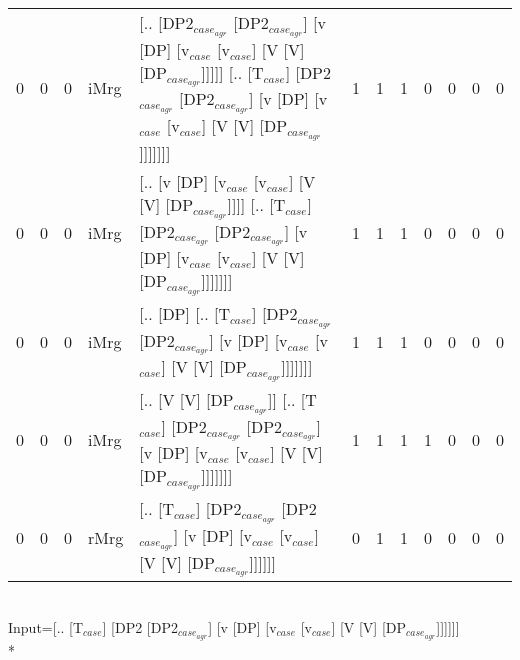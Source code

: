 \begin{tabularx}{\linewidth}{rrrlXrrrrrrr}
   0 &       0 &   0 & iMrg & [.. [DP2$_{case_{agr}}$ [DP2$_{case_{agr}}$] [v [DP] [v$_{case}$ [v$_{case}$] [V [V] [DP$_{case_{agr}}$]]]]] [.. [T$_{case}$] [DP2$_{case_{agr}}$ [DP2$_{case_{agr}}$] [v [DP] [v$_{case}$ [v$_{case}$] [V [V] [DP$_{case_{agr}}$]]]]]]] &            1 &             1 &             1 &                  0 &              0 &              0 &            0 \\
   0 &       0 &   0 & iMrg & [.. [v [DP] [v$_{case}$ [v$_{case}$] [V [V] [DP$_{case_{agr}}$]]]] [.. [T$_{case}$] [DP2$_{case_{agr}}$ [DP2$_{case_{agr}}$] [v [DP] [v$_{case}$ [v$_{case}$] [V [V] [DP$_{case_{agr}}$]]]]]]]                               &            1 &             1 &             1 &                  0 &              0 &              0 &            0 \\
   0 &       0 &   0 & iMrg & [.. [DP] [.. [T$_{case}$] [DP2$_{case_{agr}}$ [DP2$_{case_{agr}}$] [v [DP] [v$_{case}$ [v$_{case}$] [V [V] [DP$_{case_{agr}}$]]]]]]]                                                                           &            1 &             1 &             1 &                  0 &              0 &              0 &            0 \\
   0 &       0 &   0 & iMrg & [.. [V [V] [DP$_{case_{agr}}$]] [.. [T$_{case}$] [DP2$_{case_{agr}}$ [DP2$_{case_{agr}}$] [v [DP] [v$_{case}$ [v$_{case}$] [V [V] [DP$_{case_{agr}}$]]]]]]]                                                          &            1 &             1 &             1 &                  1 &              0 &              0 &            0 \\
   0 &       0 &   0 & rMrg & [.. [T$_{case}$] [DP2$_{case_{agr}}$ [DP2$_{case_{agr}}$] [v [DP] [v$_{case}$ [v$_{case}$] [V [V] [DP$_{case_{agr}}$]]]]]]                                                                                     &            0 &             1 &             1 &                  0 &              0 &              0 &            0 \\
\hline
\end{tabularx}\endgroup\\
\begingroup\scriptsize Input=[.. [T$_{case}$] [DP2 [DP2$_{case_{agr}}$] [v [DP] [v$_{case}$ [v$_{case}$] [V [V] [DP$_{case_{agr}}$]]]]]]\\*
